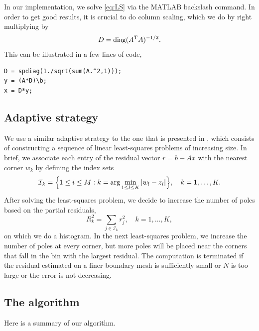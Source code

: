 \documentclass{article}
\begin{document}
In our implementation, we solve \eqref{eq:LS} via the MATLAB backslash command.
In order to get good results, it is crucial to do column scaling, which we do
by right multiplying by
\begin{equation}
D=\operatorname{diag}( A^{\text{T}} A)^{-1/2}.
\end{equation} 
This can be illustrated in a few lines of code,
\begin{verbatim}
D = spdiag(1./sqrt(sum(A.^2,1)));
y = (A*D)\b; 
x = D*y;
\end{verbatim}


\subsection{Adaptive strategy}
We use a similar adaptive strategy to the one that is presented in
\cite{gopal19}, which consists of constructing a sequence of linear
least-squares problems of increasing size. In brief, we associate each entry of
the residual vector $r=b-Ax$ with the nearest corner $w_k$ by defining the
index sets
\begin{equation}
\mathcal{I}_k = \Big\{1\leq i\leq M : k=\arg\min_{1\leq l \leq K} \abs{w_l-z_i}\Big\},\quad k=1,\ldots, K.
\end{equation}
After solving the least-squares problem, we decide to increase the number of
poles based on the partial residuals, 
\begin{equation}
R_k^2 = \sum_{j\in \mathcal{I}_k} r_j^2,\quad k=1,\ldots, K,
\end{equation}
on which we do a histogram. In the next least-squares problem, we increase the
number of poles at every corner, but more poles will be placed near the corners
that fall in the bin with the largest residual. The computation is terminated
if the residual estimated on a finer boundary mesh is sufficiently small or $N$
is too large or the error is not decreasing.


\subsection{The algorithm}
Here is a summary of our algorithm. 
\end{document}
